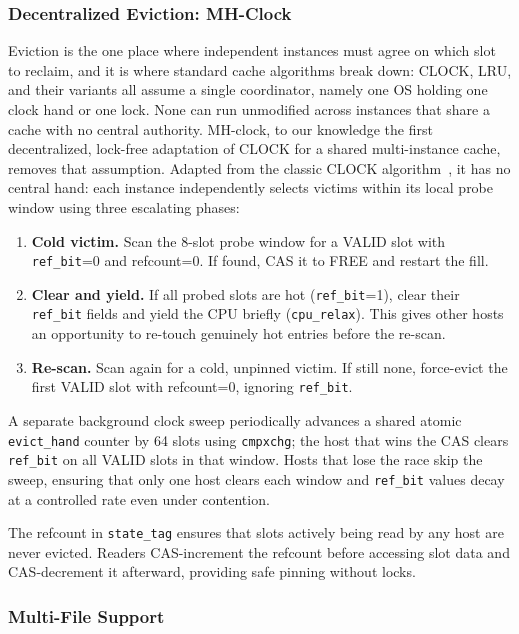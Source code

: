 \documentclass[letterpaper,twocolumn,10pt]{article}
\begin{document}
\subsubsection{Decentralized Eviction: MH-Clock}
\label{sec:mhclock}

Eviction is the one place where independent instances must agree on
which slot to reclaim, and it is where standard cache algorithms break
down: CLOCK, LRU, and their variants all assume a single coordinator,
namely one OS holding one clock hand or one lock.  None can run
unmodified across instances that share a cache with no central
authority.  MH-clock, to our knowledge the first decentralized,
lock-free adaptation of CLOCK for a shared multi-instance cache,
removes that assumption.  Adapted from the classic CLOCK
algorithm~\cite{corbato68:clock}, it has no central hand: each instance
independently selects victims within its local probe window using three
escalating phases:

\begin{enumerate}
\item \textbf{Cold victim.}  Scan the 8-slot probe window for a
  VALID slot with \texttt{ref\_bit}=0 and refcount=0.  If found,
  CAS it to FREE and restart the fill.
\item \textbf{Clear and yield.}  If all probed slots are hot
  (\texttt{ref\_bit}=1), clear their \texttt{ref\_bit} fields and
  yield the CPU briefly (\texttt{cpu\_relax}).  This gives other
  hosts an opportunity to re-touch genuinely hot entries before
  the re-scan.
\item \textbf{Re-scan.}  Scan again for a cold, unpinned victim.
  If still none, force-evict the first VALID slot with refcount=0,
  ignoring \texttt{ref\_bit}.
\end{enumerate}

A separate background clock sweep periodically advances a shared
atomic \texttt{evict\_hand} counter by 64 slots using
\texttt{cmpxchg}; the host that wins the CAS clears
\texttt{ref\_bit} on all VALID slots in that window.  Hosts that
lose the race skip the sweep, ensuring that only one host clears
each window and \texttt{ref\_bit} values decay at a controlled rate even under
contention.

The refcount in \texttt{state\_tag} ensures that slots actively
being read by any host are never evicted.  Readers CAS-increment
the refcount before accessing slot data and CAS-decrement it
afterward, providing safe pinning without locks.

\subsubsection{Multi-File Support}
\end{document}
